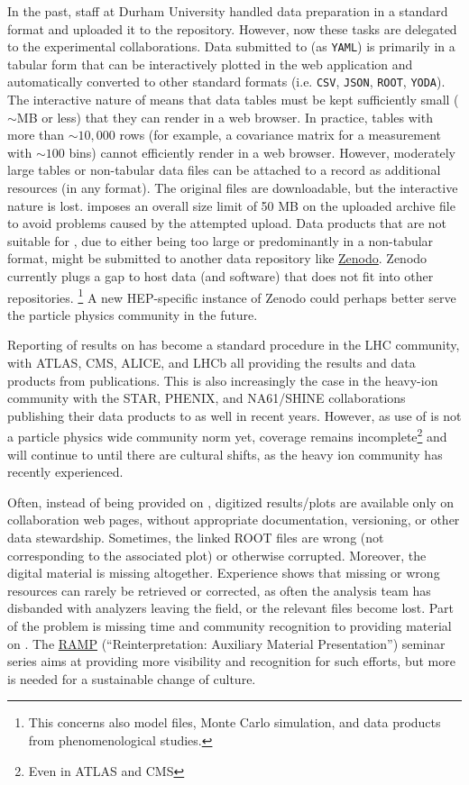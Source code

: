 \documentclass[11pt]{article}
\begin{document}
In the past, \hepdata staff at Durham University handled data preparation in a standard format and uploaded it to the repository.
However, now these tasks are delegated to the experimental collaborations.
Data submitted to \hepdata (as \texttt{YAML}) is primarily in a tabular form that can be interactively plotted in the web application and automatically converted to other standard formats (i.e. \texttt{CSV}, \texttt{JSON}, \texttt{ROOT}, \texttt{YODA}).
The interactive nature of \hepdata means that data tables must be kept sufficiently small ($\sim$MB or less) that they can render in a web browser.
In practice, tables with more than $\sim 10,000$ rows (for example, a covariance matrix for a measurement with $\sim 100$ bins) cannot efficiently render in a web browser.
However, moderately large tables or non-tabular data files can be attached to a \hepdata record as additional resources (in any format).
The original files are downloadable, but the interactive nature is lost.
\hepdata imposes an overall size limit of 50 MB on the uploaded archive file to avoid problems caused by the attempted upload. 
%
Data products that are not suitable for \hepdata, due to either being too large or predominantly in a non-tabular format, might be submitted to another data repository like \href{https://zenodo.org/}{Zenodo}.
Zenodo currently plugs a gap to host data (and software) that does not fit into other repositories.%
\footnote{This concerns also model files, Monte Carlo simulation, and data products from phenomenological studies.}
A new \gls{HEP}-specific instance of Zenodo could perhaps better serve the particle physics community in the future.


Reporting of results on \hepdata has become a standard procedure in the \gls{LHC} community, with \gls{ATLAS}, \gls{CMS}, \gls{ALICE}, and \gls{LHCb} all providing the results and data products from publications.
This is also increasingly the case in the heavy-ion community with the \gls{STAR}, \gls{PHENIX}, and NA61/SHINE collaborations publishing their data products to \hepdata as well in recent years.
However, as use of \hepdata is not a particle physics wide community norm yet, coverage remains incomplete\footnote{Even in \gls{ATLAS} and \gls{CMS}} and will continue to until there are cultural shifts, as the heavy ion community has recently experienced.

Often, instead of being provided on \hepdata, digitized results/plots are available only on collaboration web pages, without appropriate documentation, versioning, or other data stewardship.
Sometimes, the linked ROOT files are wrong (not corresponding to the associated plot) or otherwise corrupted.
Moreover, the digital material is missing altogether.
Experience shows that missing or wrong resources can rarely be retrieved or corrected, as often the analysis team has disbanded with analyzers leaving the field, or the relevant files become lost. 
Part of the problem is missing time and community recognition to providing material on \hepdata.
The \href{https://indico.cern.ch/category/14155/}{RAMP} (``Reinterpretation: Auxiliary Material Presentation'') seminar series aims at providing more visibility and recognition for such efforts,  but more is needed for a 
sustainable change of culture. 
\end{document}
